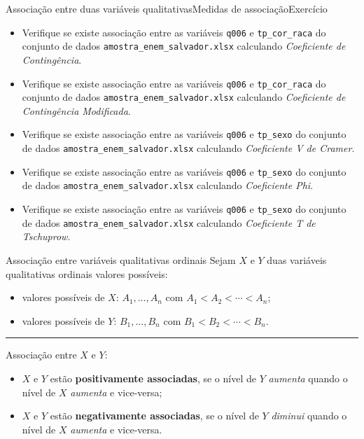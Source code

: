 \documentclass[
  10pt,
  ignorenonframetext,
]{beamer}
\providecommand{\tightlist}{%
  \setlength{\itemsep}{0pt}\setlength{\parskip}{0pt}}\usepackage{longtable,booktabs,array}
\newcommand*{\regrafina}{\rule{\textwidth}{0.5pt}}
\begin{document}
\begin{frame}[fragile]{Associação entre duas variáveis
qualitativas\newline Medidas de associação\newline Exercício}
\protect\hypertarget{associauxe7uxe3o-entre-duas-variuxe1veis-qualitativasmedidas-de-associauxe7uxe3oexercuxedcio}{}
\begin{itemize}
\tightlist
\item
  Verifique se existe associação entre as variáveis \texttt{q006} e
  \texttt{tp\_cor\_raca} do conjunto de dados
  \texttt{amostra\_enem\_salvador.xlsx} calculando \emph{Coeficiente de
  Contingência}.
\item
  Verifique se existe associação entre as variáveis \texttt{q006} e
  \texttt{tp\_cor\_raca} do conjunto de dados
  \texttt{amostra\_enem\_salvador.xlsx} calculando \emph{Coeficiente de
  Contingência Modificada}.
\item
  Verifique se existe associação entre as variáveis \texttt{q006} e
  \texttt{tp\_sexo} do conjunto de dados
  \texttt{amostra\_enem\_salvador.xlsx} calculando \emph{Coeficiente V
  de Cramer}.
\item
  Verifique se existe associação entre as variáveis \texttt{q006} e
  \texttt{tp\_sexo} do conjunto de dados
  \texttt{amostra\_enem\_salvador.xlsx} calculando \emph{Coeficiente
  Phi}.
\item
  Verifique se existe associação entre as variáveis \texttt{q006} e
  \texttt{tp\_sexo} do conjunto de dados
  \texttt{amostra\_enem\_salvador.xlsx} calculando \emph{Coeficiente T
  de Tschuprow}.
\end{itemize}
\end{frame}

\begin{frame}{Associação entre variáveis qualitativas ordinais}
\protect\hypertarget{associauxe7uxe3o-entre-variuxe1veis-qualitativas-ordinais}{}
Sejam \(X\) e \(Y\) duas variáveis qualitativas ordinais valores
possíveis:

\begin{itemize}
\tightlist
\item
  valores possíveis de \(X\): \(A_1, \dots, A_n\) com
  \(A_1 < A_2 < \cdots < A_n\);
\item
  valores possíveis de \(Y\): \(B_1, \dots, B_n\) com
  \(B_1 < B_2 < \cdots < B_n\).
\end{itemize}

\regrafina

Associação entre \(X\) e \(Y\):

\begin{itemize}
\tightlist
\item
  \(X\) e \(Y\) estão \textbf{positivamente associadas}, se o nível de
  \(Y\) \emph{aumenta} quando o nível de \(X\) \emph{aumenta} e
  vice-versa;
\item
  \(X\) e \(Y\) estão \textbf{negativamente associadas}, se o nível de
  \(Y\) \emph{diminui} quando o nível de \(X\) \emph{aumenta} e
  vice-versa.
\end{itemize}
\end{frame}
\end{document}
